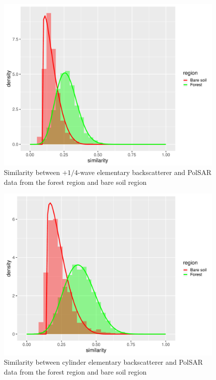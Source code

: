 \documentclass[conference]{IEEEtran}
\begin{document}
\begin{figure}[!ht]
    \centering
    \includegraphics[width = .9\linewidth, height = .7\linewidth]{../../../Figures/paper_19_05/wvp.pdf}
    \caption{Similarity between $+1/4$-wave elementary backscatterer and PolSAR data from the forest region and bare soil region}
    \label{fig:wvp}
\end{figure}

\begin{figure}[!ht]
    \centering
    \includegraphics[width = .9\linewidth, height = .7\linewidth]{../../../Figures/paper_19_05/cy.pdf}
    \caption{Similarity between cylinder elementary backscatterer and PolSAR data from the forest region and bare soil region}
    \label{fig:cy}
\end{figure}
\end{document}
